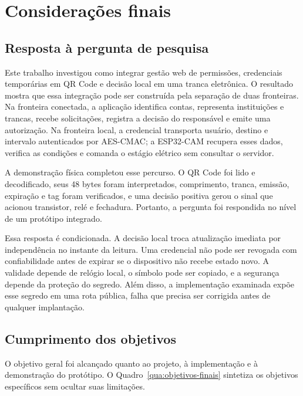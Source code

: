 \chapter{Considerações finais} \label{cap:consideracoes}

\section{Resposta à pergunta de pesquisa}

Este trabalho investigou como integrar gestão web de permissões, credenciais temporárias em QR Code e decisão local em uma tranca eletrônica. O resultado mostra que essa integração pode ser construída pela separação de duas fronteiras. Na fronteira conectada, a aplicação identifica contas, representa instituições e trancas, recebe solicitações, registra a decisão do responsável e emite uma autorização. Na fronteira local, a credencial transporta usuário, destino e intervalo autenticados por AES-CMAC; a ESP32-CAM recupera esses dados, verifica as condições e comanda o estágio elétrico sem consultar o servidor.

A demonstração física completou esse percurso. O QR Code foi lido e decodificado, seus 48 bytes foram interpretados, comprimento, tranca, emissão, expiração e tag foram verificados, e uma decisão positiva gerou o sinal que acionou transistor, relé e fechadura. Portanto, a pergunta foi respondida no nível de um protótipo integrado.

Essa resposta é condicionada. A decisão local troca atualização imediata por independência no instante da leitura. Uma credencial não pode ser revogada com confiabilidade antes de expirar se o dispositivo não recebe estado novo. A validade depende de relógio local, o símbolo pode ser copiado, e a segurança depende da proteção do segredo. Além disso, a implementação examinada expõe esse segredo em uma rota pública, falha que precisa ser corrigida antes de qualquer implantação.

\section{Cumprimento dos objetivos}

O objetivo geral foi alcançado quanto ao projeto, à implementação e à demonstração do protótipo. O Quadro~\ref{qua:objetivos-finais} sintetiza os objetivos específicos sem ocultar suas limitações.

